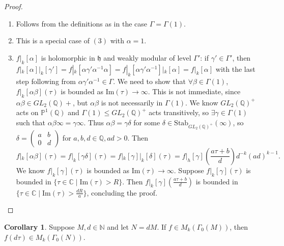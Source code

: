 \documentclass{article}
\theoremstyle{definition}
\newtheorem{cor}[theorem]{Corollary}
\begin{document}
\begin{proof}
    \begin{enumerate}[(1)]
        \item Follows from the definitions as in the case $\Gamma= \Gamma(1)$.
        \item This is a special case of $(3)$ with $\alpha = 1$.
        \item $f|_k[\alpha]$ is holomorphic in $\mathfrak{h}$ and weakly modular of level $\Gamma'$: if $\gamma' \in \Gamma'$, then $f|_k[\alpha]|_k[\gamma'] = f|_k[\alpha \gamma' \alpha^{-1} \alpha] = f|_k[\alpha \gamma' \alpha^{-1}]|_k[\alpha] = f|_k[\alpha]$ with the last step following from $\alpha \gamma' \alpha^{-1} \in \Gamma$. We need to show that $\forall \beta \in \Gamma(1)$, $f|_k[\alpha \beta](\tau)$ is bounded as $\text{Im}(\tau) \to \infty$. This is not immediate, since $\alpha \beta \in GL_2(\mathbb{Q})+$, but $\alpha \beta$ is not necessarily in $\Gamma(1)$. We know $GL_2(\mathbb{Q})^+$ acts on $\mathbb{P}^1(\mathbb{Q})$ and $\Gamma(1) \le GL_2(\mathbb{Q})^+$ acts transitively, so $\exists \gamma \in \Gamma(1)$ such that $\alpha \beta \infty = \gamma \infty$. Thus $\alpha \beta = \gamma \delta$ for some $\delta \in \text{Stab}_{GL_2(\mathbb{Q})^+}(\infty)$, so $\delta = \begin{pmatrix} a&b\\0&d \end{pmatrix}$ for $a,b,d \in \mathbb{Q}, ad>0$. Then $$f|_k[\alpha \beta](\tau) = f|_k[\gamma \delta](\tau) = f|_k[\gamma]|_k[\delta](\tau) = f|_h[\gamma]\left(\frac{a \tau + b}{d}\right) d^{-k} (ad)^{k-1}.$$
        We know $f|_k[\gamma](\tau)$ is bounded as $\text{Im}(\tau) \to \infty$. Suppose $f|_k[\gamma](\tau)$ is bounded in $\{\tau \in \mathbb{C} \mid \text{Im}(\tau) > R\}$. Then $f|_k[\gamma]\left(\frac{a \tau + b}{d}\right)$ is bounded in $\{\tau \in \mathbb{C} \mid \text{Im}(\tau) > \frac{dR}{a}\}$, concluding the proof.
    \end{enumerate}
\end{proof}
\begin{cor}
    Suppose $M,d \in \mathbb{N}$ and let $N=dM$. If $f \in M_k(\Gamma_0(M))$, then $f(d \tau) \in M_k(\Gamma_0(N))$.    
\end{cor}
\end{document}
